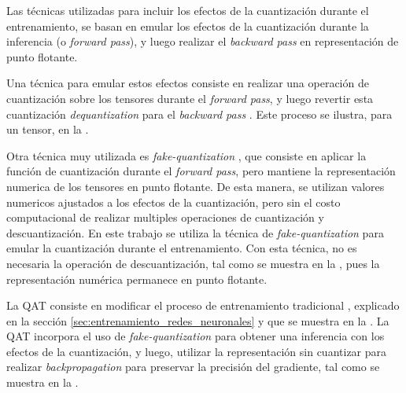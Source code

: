 Las técnicas utilizadas para incluir los efectos de la cuantización durante el entrenamiento, se basan en emular los efectos de la cuantización durante la inferencia (o \textit{forward pass}), y luego realizar el \textit{backward pass} en representación de punto flotante.

Una técnica para emular estos efectos consiste en realizar una operación de cuantización sobre los tensores durante el \textit{forward pass}, y luego revertir esta cuantización \textit{dequantization} para el \textit{backward pass} \cite{dai2024trainablefixedpointquantizationdeep}. Este proceso se ilustra, para un tensor, en la .


Otra técnica muy utilizada es \textit{fake-quantization} \cite{dai2024trainablefixedpointquantizationdeep}, que consiste en aplicar la función de cuantización durante el \textit{forward pass}, pero mantiene la representación numerica de los tensores en punto flotante. De esta manera, se utilizan valores numericos ajustados a los efectos de la cuantización, pero sin el costo computacional de realizar multiples operaciones de cuantización y descuantización. En este trabajo se utiliza la técnica de \textit{fake-quantization} para emular la cuantización durante el entrenamiento. Con esta técnica, no es necesaria la operación de descuantización, tal como se muestra en la , pues la representación numérica permanece en punto flotante.


La QAT consiste en modificar el proceso de entrenamiento tradicional \cite{Jacob2018}, explicado en la sección \ref{sec:entrenamiento_redes_neuronales} y que se muestra en la . La QAT incorpora el uso de \textit{fake-quantization} para obtener una inferencia con los efectos de la cuantización, y luego, utilizar la representación sin cuantizar para realizar \textit{backpropagation} para preservar la precisión del gradiente, tal como se muestra en la .

